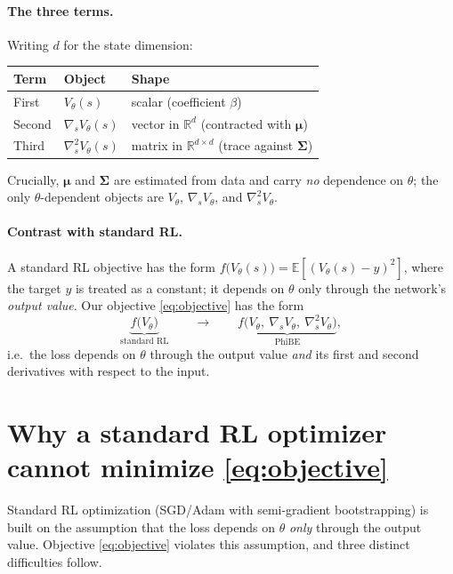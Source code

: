 \documentclass[11pt]{article}
\newcommand{\R}{\mathbb{R}}
\newcommand{\E}{\mathbb{E}}
\newcommand{\grads}{\nabla_s}
\newcommand{\hess}{\nabla_s^2}
\begin{document}
\paragraph{The three terms.}
Writing $d$ for the state dimension:
\begin{center}
\begin{tabular}{lll}
\hline
Term & Object & Shape \\
\hline
First  & $V_\theta(s)$        & scalar (coefficient $\beta$) \\
Second & $\grads V_\theta(s)$ & vector in $\R^{d}$ (contracted with $\bm{\mu}$) \\
Third  & $\hess V_\theta(s)$  & matrix in $\R^{d\times d}$ (trace against $\bm{\Sigma}$) \\
\hline
\end{tabular}
\end{center}
Crucially, $\bm{\mu}$ and $\bm{\Sigma}$ are estimated from data and carry
\emph{no} dependence on $\theta$; the only $\theta$-dependent objects are
$V_\theta$, $\grads V_\theta$, and $\hess V_\theta$.

\paragraph{Contrast with standard RL.}
A standard RL objective has the form
$f\big(V_\theta(s)\big) = \E[(V_\theta(s) - y)^2]$, where the target $y$ is
treated as a constant; it depends on $\theta$ only through the network's
\emph{output value}. Our objective \eqref{eq:objective} has the form
\begin{equation}
\label{eq:contrast}
\underbrace{f\big(V_\theta\big)}_{\text{standard RL}}
\qquad\longrightarrow\qquad
\underbrace{f\big(V_\theta,\ \grads V_\theta,\ \hess V_\theta\big)}_{\text{PhiBE}} ,
\end{equation}
i.e.\ the loss depends on $\theta$ through the output value
\emph{and} its first and second derivatives with respect to the input.

\section{Why a standard RL optimizer cannot minimize \eqref{eq:objective}}

Standard RL optimization (SGD/Adam with semi-gradient bootstrapping) is
built on the assumption that the loss depends on $\theta$ \emph{only}
through the output value. Objective \eqref{eq:objective} violates this
assumption, and three distinct difficulties follow.
\end{document}
